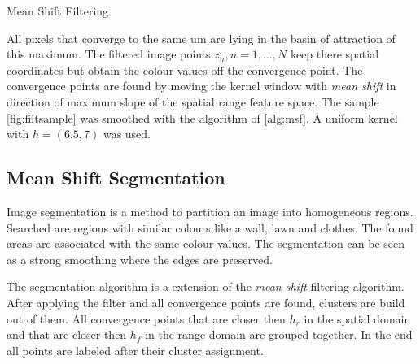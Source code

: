 \begin{algorithm2e}[H]
	\DontPrintSemicolon
	\BlankLine
	
	\BlankLine
	\BlankLine

	\caption{Mean Shift Filtering}
	\label{alg:msf}
\end{algorithm2e}


All pixels that converge to the same um are lying in the basin of
attraction of this maximum. The filtered image points $z_n, n = 1 ,
\ldots , N$ keep there spatial coordinates but obtain the colour values
off the convergence point. The convergence points are found by moving
the kernel window with \emph{mean shift} in direction of maximum slope
of the spatial range feature space. The sample
\autoref{fig:filtsample} was smoothed with the algorithm of
\autoref{alg:msf}.  A uniform kernel with $h = (6.5, 7)$ was used.

\subsection{Mean Shift Segmentation} %
\label{sub:mean_shift_segmentation}
Image segmentation is a method to partition an image into homogeneous
regions.  Searched are regions with similar colours like a wall, lawn
and clothes.  The found areas are associated with the same colour
values. The segmentation can be seen as a strong smoothing where the
edges are preserved.

The segmentation algorithm is a extension of the \emph{mean shift }
filtering algorithm. After applying the filter and all convergence
points are found, clusters are build out of them. All convergence
points that are closer then $h_r$ in the spatial domain and that are
closer then $h_f$ in the range domain are grouped together. In the end
all points are labeled after their cluster assignment.

